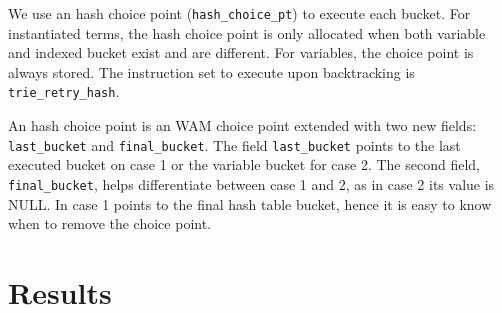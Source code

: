 We use an hash choice point (\texttt{hash\_choice\_pt}) to execute each bucket.
For instantiated terms, the hash choice point is only allocated when both variable and indexed bucket
exist and are different. For variables, the choice point is always stored. The instruction
set to execute upon backtracking is \texttt{trie\_retry\_hash}.

An hash choice point is an WAM choice point extended with two new fields:
\texttt{last\_bucket} and \texttt{final\_bucket}.
The field \texttt{last\_bucket} points to the last executed bucket on case 1 or the
variable bucket for case 2.
The second field, \texttt{final\_bucket}, helps differentiate between
case 1 and 2, as in case 2 its value is NULL. In case 1 points to the final hash table bucket,
hence it is easy to know when to remove the choice point.

\section{Results}

